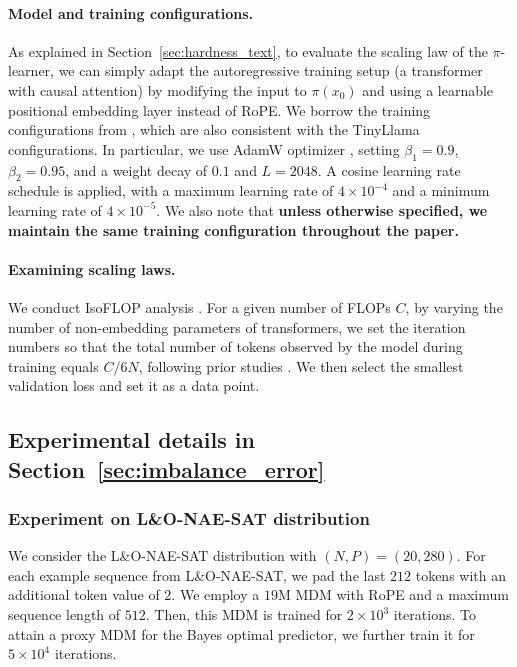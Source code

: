 \paragraph{Model and training configurations.} As explained in Section~\ref{sec:hardness_text}, to evaluate the scaling law of the $\pi$-learner, we can simply adapt the autoregressive training setup (a transformer with causal attention) by modifying the input to $\pi(x_0)$ and using a learnable positional embedding layer instead of RoPE. We borrow the training configurations from \cite{nie2024scaling}, which are also consistent with the TinyLlama \cite{zhang2024tinyllama} configurations. In particular, we use AdamW optimizer \cite{loshchilov2019decoupled}, setting $\beta_1 = 0.9$, $\beta_2 = 0.95$, and a weight decay of $0.1$ and $L=2048$.
A cosine learning rate schedule is applied, with a maximum learning rate of $4 \times 10^{-4}$ and a minimum learning rate of $4 \times 10^{-5}$. We also note that \textbf{unless otherwise specified, we maintain the same training configuration throughout the paper.}


\paragraph{Examining scaling laws.} We conduct IsoFLOP analysis \cite{hoffmann2022trainingcomputeoptimallargelanguage}. For a given number of FLOPs $C$, by varying the number of non-embedding parameters of transformers, we set the iteration numbers so that the total number of tokens observed by the model during training equals $C/6N$, following prior studies \cite{hoffmann2022trainingcomputeoptimallargelanguage, kaplan2020scaling}. We then select the smallest validation loss and set it as a data point.


\subsection{Experimental details in Section~\ref{sec:imbalance_error}}
\label{appendix:exp_detail_3_3}

\subsubsection{Experiment on L\&O-NAE-SAT distribution} We consider the L\&O-NAE-SAT distribution with $(N,P) = (20,280)$. For each example sequence from L\&O-NAE-SAT, we pad the last $212$ tokens with an additional token value of $2$. We employ a $19$M MDM with RoPE and a maximum sequence length of $512$. Then, this MDM is trained for $2\times 10^3$ iterations. To attain a proxy MDM for the Bayes optimal predictor, we further train it for $5 \times 10^4$ iterations. 


